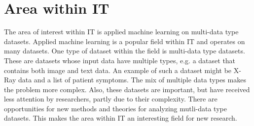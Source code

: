 \chapter{Area within IT}

The area of interest within IT is applied machine learning on multi-data type datasets.  Applied machine learning is a popular field within IT and operates on many datasets.  One type of dataset within the field is multi-data type datasets.  These are datasets whose input data have multiple types, e.g. a dataset that contains both image and text data.  An example of such a dataset might be X-Ray data and a list of patient symptoms.  The mix of multiple data types makes the problem more complex.  Also, these datasets are important, but have received less attention by researchers, partly due to their complexity.  There are opportunities for new methods and theories for analyzing mutli-data type datasets.  This makes the area within IT an interesting field for new research.








